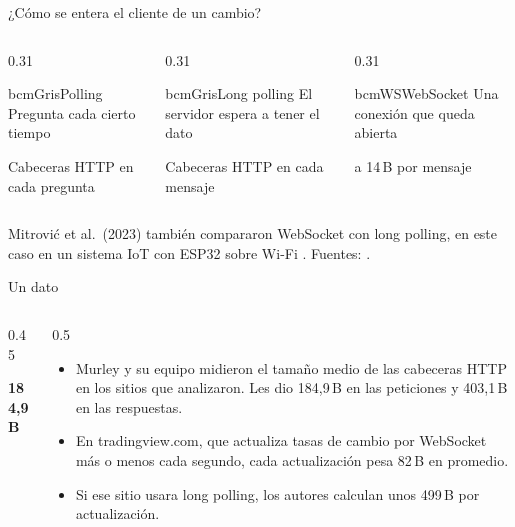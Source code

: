 \begin{frame}{¿Cómo se entera el cliente de un cambio?}
  \begin{columns}[T]
    \begin{column}{0.31\textwidth}
      \begin{tarjeta}[equal height group=alternativas]{bcmGris}{Polling}
        \small
        Pregunta cada cierto tiempo\par\medskip
        Cabeceras HTTP en cada pregunta
      \end{tarjeta}
    \end{column}
    \begin{column}{0.31\textwidth}
      \begin{tarjeta}[equal height group=alternativas]{bcmGris}{Long polling}
        \small
        El servidor espera a tener el dato\par\medskip
        Cabeceras HTTP en cada mensaje
      \end{tarjeta}
    \end{column}
    \begin{column}{0.31\textwidth}
      \begin{tarjeta}[equal height group=alternativas]{bcmWS}{WebSocket}
        \small
        Una conexión que queda abierta\par{} a 14\,B por mensaje
      \end{tarjeta}
    \end{column}
  \end{columns}
  \vfill
  {\scriptsize\color{bcmGris}Mitrović et al.\ (2023) también compararon WebSocket con long polling, en
    este caso en un sistema IoT con ESP32 sobre Wi-Fi \cite[p.~267]{Mitrovic2023}.
    Fuentes: \cite[secc.~2.2 y 2.4]{Murley2021}.\par}
\end{frame}

\begin{frame}{Un dato}
  \begin{columns}[c]
    \begin{column}{0.45\textwidth}
      \centering
      {\color{bcmWS}\fontsize{40}{44}\selectfont\bfseries184,9\,B\par}
    \end{column}
    \begin{column}{0.5\textwidth}
      \small
      \begin{itemize}
        \item Murley y su equipo midieron el tamaño medio de las cabeceras HTTP en los sitios que
          analizaron. Les dio 184,9\,B en las peticiones y 403,1\,B en las respuestas.
        \item En tradingview.com, que actualiza tasas de cambio por WebSocket más o menos cada segundo,
          cada actualización pesa 82\,B en promedio.
        \item Si ese sitio usara long polling, los autores calculan unos 499\,B por actualización.
      \end{itemize}
      {\small\color{bcmGris}\cite[secc.~3.3.4, p.~1197]{Murley2021}\par}
    \end{column}
  \end{columns}
\end{frame}
